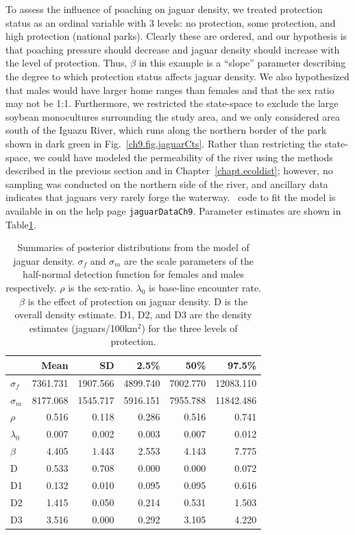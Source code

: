 To assess the influence of poaching on jaguar density, we treated
protection status as an ordinal variable with 3 levels: no protection,
some protection, and high protection (national parks). Clearly these
are ordered, and our
hypothesis is that poaching pressure should decrease and jaguar
density should increase with the level of
protection. Thus, $\beta$ in this example is a ``slope''
parameter describing the degree to which protection status affects
jaguar density. We also hypothesized that males would have larger home
ranges than females \citep{conde_etal:2010,sollmann_etal:2011} and that the sex ratio may not be
1:1. Furthermore, we restricted the state-space to exclude the large
soybean monocultures surrounding the study area, and we only
considered
area south of the Iguazu River, which runs along the northern border
of the park shown in dark green in
Fig.~\ref{ch9.fig.jaguarCts}. Rather than restricting the
state-space, we could have modeled the permeability of the river using
the methods described in the previous section and in
Chapter~\ref{chapt.ecoldist}; however, no sampling was conducted on
the northern side of the river, and ancillary data indicates that
jaguars very rarely forge the waterway. \R~code to fit the model is
available in \scrbook  on the help page \verb+jaguarDataCh9+. Parameter
estimates are shown in Table\ref{ch9.tab.jagposts}.
\begin{table}
\centering
\caption{Summaries of posterior distributions from the model of jaguar
  density. $\sigma_f$ and $\sigma_m$ are the scale parameters of
  the half-normal detection function for females and males
  respectively. $\rho$ is the
  sex-ratio. $\lambda_0$ is base-line encounter rate. $\beta$ is the
  effect of protection on jaguar density. D is the overall density
  estimate. D1, D2, and D3 are the density estimates
  (jaguars/100km$^2$) for the three levels of protection. }
\begin{tabular}{lrrrrr}
\hline
& Mean & SD & 2.5\% & 50\% & 97.5\% \\
\hline
 $\sigma_f$ &  7361.731 &  1907.566 &  4899.740 &  7002.770 & 12083.110 \\
 $\sigma_m$ &  8177.068 &  1545.717 &  5916.151 &  7955.788 & 11842.486 \\
 $\rho$ &     0.516 &     0.118 &     0.286 &     0.516 &     0.741 \\
 $\lambda_0$ &     0.007 &     0.002 &     0.003 &     0.007 &     0.012 \\
 $\beta$ &     4.405 &     1.443 &     2.553 &     4.143 &     7.775 \\
 D &     0.533 &     0.708 &     0.000 &     0.000 &     0.072 \\
 D1 &     0.132 &     0.010 &     0.095 &     0.095 &     0.616 \\
 D2 &     1.415 &     0.050 &     0.214 &     0.531 &     1.503 \\
 D3 &     3.516 &     0.000 &     0.292 &     3.105 &     4.220 \\
\hline
\end{tabular}
\label{ch9.tab.jagposts}
\end{table}

